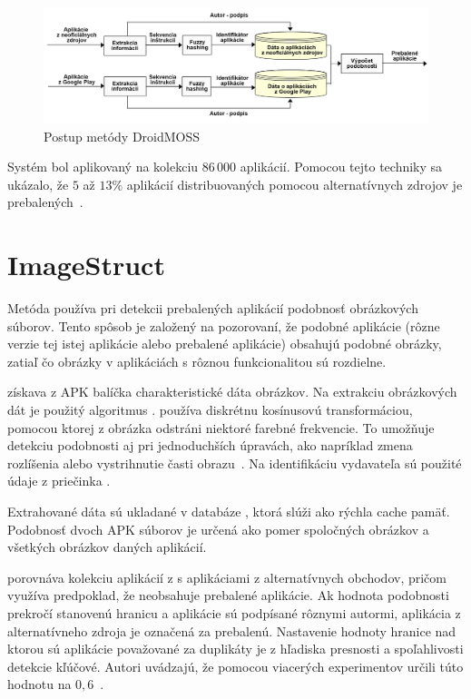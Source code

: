 \begin{figure}[htb]
  \begin{center}
    \includegraphics[width=130mm]{images/DroidMoss.png}
  \end{center}
  \caption{Postup metódy DroidMOSS}
  \label{fig:strukturaDroidMoss}
\end{figure}


Systém  bol aplikovaný na kolekciu $86\,000$ aplikácií. Pomocou tejto techniky sa ukázalo, že $5$ až $13\%$  aplikácií distribuovaných pomocou alternatívnych zdrojov je prebalených~\cite{DetectingRepackagedZhou}.


\section{ImageStruct}

Metóda  používa pri detekcii prebalených aplikácií podobnosť obrázkových súborov. Tento spôsob je založený na pozorovaní, že podobné aplikácie (rôzne verzie tej istej aplikácie alebo prebalené aplikácie) obsahujú podobné obrázky, zatiaľ čo obrázky v aplikáciách s rôznou funkcionalitou sú rozdielne. 

 získava z APK balíčka charakteristické dáta obrázkov. Na extrakciu obrázkových dát je použitý algoritmus .  používa diskrétnu kosínusovú transformáciou, pomocou ktorej z obrázka odstráni niektoré farebné frekvencie. To umožňuje detekciu podobnosti aj pri jednoduchších úpravách, ako napríklad zmena rozlíšenia alebo vystrihnutie časti obrazu~\cite{pHash}. Na identifikáciu vydavateľa sú použité údaje z priečinka .


Extrahované dáta sú ukladané v databáze , ktorá slúži ako rýchla cache pamäť. 
Podobnosť dvoch APK súborov je určená ako pomer spoločných obrázkov a všetkých obrázkov daných aplikácií.

  porovnáva kolekciu aplikácií z  s aplikáciami z alternatívnych obchodov, pričom využíva predpoklad, že  neobsahuje prebalené aplikácie. Ak hodnota podobnosti prekročí stanovenú hranicu a aplikácie sú podpísané rôznymi autormi, aplikácia z alternatívneho zdroja je označená za prebalenú.
Nastavenie hodnoty hranice nad ktorou sú aplikácie považované za duplikáty je z hľadiska presnosti a spoľahlivosti detekcie kľúčové. Autori uvádzajú, že pomocou viacerých experimentov určili túto hodnotu na $0,6$~\cite{ImageStruct}.

